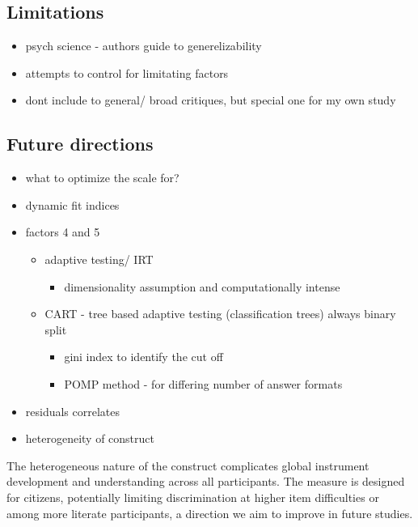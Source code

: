 \documentclass[
  12pt,
  a4paper,
  twoside]{article}
\providecommand{\tightlist}{%
  \setlength{\itemsep}{0pt}\setlength{\parskip}{0pt}}
\begin{document}
\subsection{Limitations}\label{limitations}

\begin{itemize}
\tightlist
\item
  psych science - authors guide to generelizability
\item
  attempts to control for limitating factors
\item
  dont include to general/ broad critiques, but special one for my own study
\end{itemize}

\subsection{Future directions}\label{future-directions}

\begin{itemize}
\tightlist
\item
  what to optimize the scale for?
\item
  dynamic fit indices
\item
  factors 4 and 5

  \begin{itemize}
  \tightlist
  \item
    adaptive testing/ IRT

    \begin{itemize}
    \tightlist
    \item
      dimensionality assumption and computationally intense
    \end{itemize}
  \item
    CART - tree based adaptive testing (classification trees) always binary split

    \begin{itemize}
    \tightlist
    \item
      gini index to identify the cut off
    \item
      POMP method - for differing number of answer formats
    \end{itemize}
  \end{itemize}
\item
  residuals correlates
\item
  heterogeneity of construct
\end{itemize}

The heterogeneous nature of the construct complicates global instrument development and understanding across all participants. The measure is designed for citizens, potentially limiting discrimination at higher item difficulties or among more literate participants, a direction we aim to improve in future studies.
\end{document}
